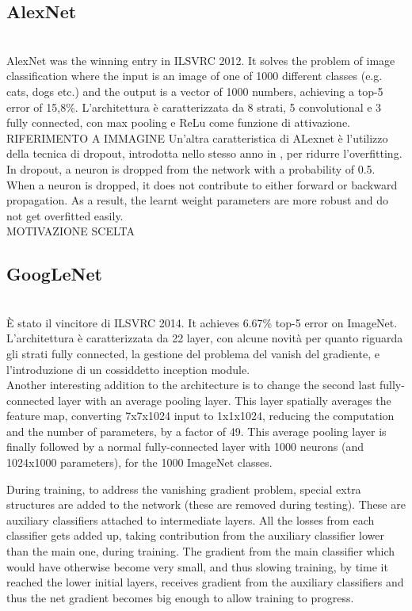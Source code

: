 \documentclass{article}
\begin{document}
\subsection{AlexNet}\mbox{}\\
AlexNet was the winning entry in ILSVRC 2012. It solves the problem of image classification where the input is an image of one of 1000 different classes (e.g. cats, dogs etc.) and the output is a vector of 1000 numbers, achieving a top-5 error of 15,8\%.
L'architettura è caratterizzata da 8 strati, 5 convolutional e 3 fully connected, con max pooling e ReLu come funzione di attivazione. RIFERIMENTO A IMMAGINE
Un'altra caratteristica di ALexnet è l'utilizzo della tecnica di dropout, introdotta nello stesso anno in \cite{dropout}, per ridurre l'overfitting. 
In dropout, a neuron is dropped from the network with a probability of 0.5. When a neuron is dropped, it does not contribute to either forward or backward propagation. 
As a result, the learnt weight parameters are more robust and do not get overfitted easily. \\

MOTIVAZIONE SCELTA


\subsection{GoogLeNet}\mbox{}\\
È stato il vincitore di ILSVRC 2014. It achieves 6.67\% top-5 error on ImageNet.
L'architettura è caratterizzata da 22 layer, con alcune novità per quanto riguarda gli strati fully connected, la gestione del problema del vanish del gradiente, e l'introduzione di un cossiddetto inception module.\\
Another interesting addition to the architecture is to change the second last fully-connected layer with an average pooling layer. This layer spatially averages the feature map, converting 7x7x1024 input to 1x1x1024, reducing the computation and the number of parameters, by a factor of 49. This average pooling layer is finally followed by a normal fully-connected layer with 1000 neurons (and 1024x1000 parameters), for the 1000 ImageNet classes.

During training, to address the vanishing gradient problem, special extra structures are added to the network (these are removed during testing). These are
auxiliary classifiers attached to intermediate layers. All the losses from each
classifier gets added up, taking contribution from the auxiliary classifier lower
than the main one, during training. The gradient from the main classifier which
would have otherwise become very small, and thus slowing training, by time it
reached the lower initial layers, receives gradient from the auxiliary classifiers
and thus the net gradient becomes big enough to allow training to progress.
\end{document}
